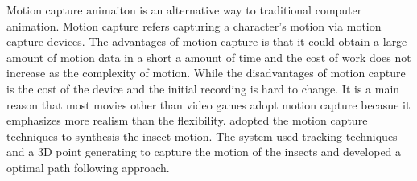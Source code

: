Motion capture animaiton is an alternative way to traditional computer animation. Motion capture refers capturing a character's motion via motion capture devices. The advantages of motion capture is that it could obtain a large amount of motion data in a short a amount of time and the cost of work does not increase as the complexity of motion. While the disadvantages of motion capture is the cost of the device and the initial recording is hard to change\cite{motionCapVirtual}. It is a main reason that most movies other than video games adopt motion capture becasue it emphasizes more realism than the flexibility. \cite{arsimu5} adopted the motion capture techniques to synthesis the insect motion. The system used tracking techniques and a 3D point generating to capture the motion of the insects and developed a optimal path following approach. 



